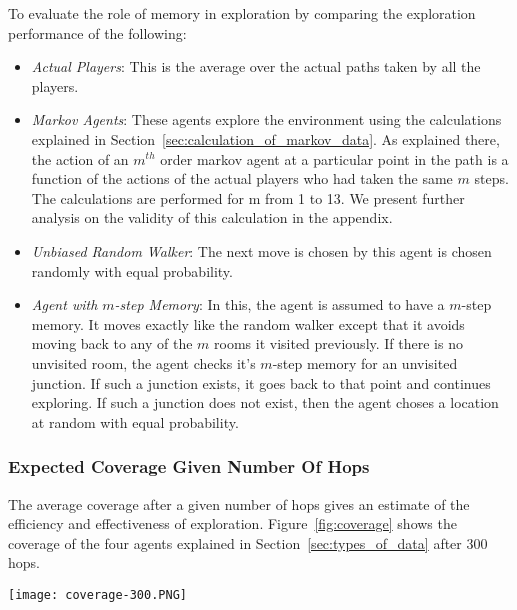 To evaluate the role of memory in exploration by comparing the exploration performance of the following:
\begin{itemize}
    \item \emph{Actual Players}: This is the average over the actual paths taken by all the players.

    \item \emph{Markov Agents}: These agents explore the environment using the calculations explained in Section~\ref{sec:calculation_of_markov_data}. As explained there, the action of an $m^{th}$ order markov agent at a particular point in the path is a function of the actions of the actual players who had taken the same $m$ steps. The calculations are performed for m from 1 to 13. We present further analysis on the validity of this calculation in the appendix.

    \item \emph{Unbiased Random Walker}:  The next move is chosen by this agent is chosen randomly with equal probability.

    \item \emph{Agent with $m$-step Memory}: In this, the agent is assumed to have a $m$-step memory. It moves exactly like the random walker except that it avoids moving back to any of the $m$ rooms it visited previously. If there is no unvisited room, the agent checks it's $m$-step memory for an unvisited junction. If such a junction exists, it goes back to that point and continues exploring. If such a junction does not exist, then the agent choses a location at random with equal probability.

\end{itemize}


\subsubsection{Expected Coverage Given Number Of Hops} %
\label{sec:calculation_4_expected_coverage_given_number_of_hops}

The average coverage after a given number of hops gives an estimate of the efficiency and effectiveness of exploration. Figure~\ref{fig:coverage} shows the coverage of the four agents explained in Section~\ref{sec:types_of_data} after 300 hops.


\begin{figure*}[tb]
    \begin{center}
        \texttt{[image: coverage-300.PNG]}
    \end{center}
    \caption{Coverage for 300 hops}
    \label{fig:coverage}
\end{figure*}


